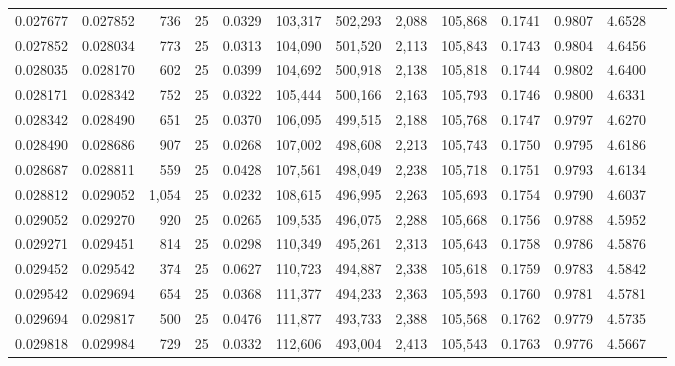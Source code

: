 \begin{tabular}{rrrrrrrrrrrrr}
0.027677 & 0.027852 &   736 &  25 &                                     0.0329 & 103,317 & 502,293 &   2,088 & 105,868 & 0.1741 & 0.9807 & 4.6528 \\
0.027852 & 0.028034 &   773 &  25 &                                     0.0313 & 104,090 & 501,520 &   2,113 & 105,843 & 0.1743 & 0.9804 & 4.6456 \\
0.028035 & 0.028170 &   602 &  25 &                                     0.0399 & 104,692 & 500,918 &   2,138 & 105,818 & 0.1744 & 0.9802 & 4.6400 \\
0.028171 & 0.028342 &   752 &  25 &                                     0.0322 & 105,444 & 500,166 &   2,163 & 105,793 & 0.1746 & 0.9800 & 4.6331 \\
0.028342 & 0.028490 &   651 &  25 &                                     0.0370 & 106,095 & 499,515 &   2,188 & 105,768 & 0.1747 & 0.9797 & 4.6270 \\
0.028490 & 0.028686 &   907 &  25 &                                     0.0268 & 107,002 & 498,608 &   2,213 & 105,743 & 0.1750 & 0.9795 & 4.6186 \\
0.028687 & 0.028811 &   559 &  25 &                                     0.0428 & 107,561 & 498,049 &   2,238 & 105,718 & 0.1751 & 0.9793 & 4.6134 \\
0.028812 & 0.029052 & 1,054 &  25 &                                     0.0232 & 108,615 & 496,995 &   2,263 & 105,693 & 0.1754 & 0.9790 & 4.6037 \\
0.029052 & 0.029270 &   920 &  25 &                                     0.0265 & 109,535 & 496,075 &   2,288 & 105,668 & 0.1756 & 0.9788 & 4.5952 \\
0.029271 & 0.029451 &   814 &  25 &                                     0.0298 & 110,349 & 495,261 &   2,313 & 105,643 & 0.1758 & 0.9786 & 4.5876 \\
0.029452 & 0.029542 &   374 &  25 &                                     0.0627 & 110,723 & 494,887 &   2,338 & 105,618 & 0.1759 & 0.9783 & 4.5842 \\
0.029542 & 0.029694 &   654 &  25 &                                     0.0368 & 111,377 & 494,233 &   2,363 & 105,593 & 0.1760 & 0.9781 & 4.5781 \\
0.029694 & 0.029817 &   500 &  25 &                                     0.0476 & 111,877 & 493,733 &   2,388 & 105,568 & 0.1762 & 0.9779 & 4.5735 \\
0.029818 & 0.029984 &   729 &  25 &                                     0.0332 & 112,606 & 493,004 &   2,413 & 105,543 & 0.1763 & 0.9776 & 4.5667 \\

\end{tabular}
